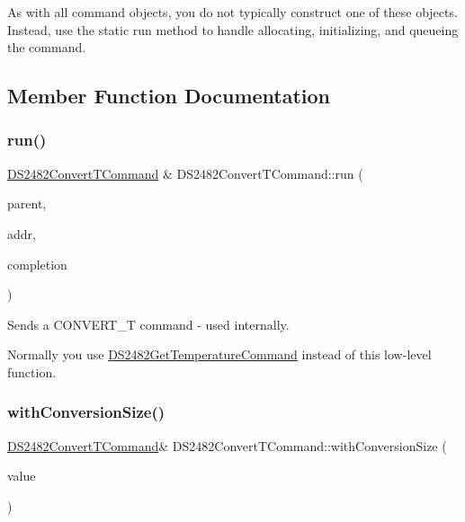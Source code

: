 As with all command objects, you do not typically construct one of these objects. Instead, use the static run method to handle allocating, initializing, and queueing the command. 

\subsection{Member Function Documentation}
\mbox{\label{class_d_s2482_convert_t_command_a81579d588ee79fadc7c41cd0bcea37f5}} 
\subsubsection{\texorpdfstring{run()}{run()}}
{\footnotesize\ttfamily \mbox{\hyperlink{class_d_s2482_convert_t_command}{D\+S2482\+Convert\+T\+Command}} \& D\+S2482\+Convert\+T\+Command\+::run (\begin{DoxyParamCaption}\item[{\mbox{\hyperlink{class_d_s2482}{D\+S2482}} \&}]{parent,  }\item[{const \mbox{\hyperlink{class_d_s24821_wire_address}{D\+S24821\+Wire\+Address}} \&}]{addr,  }\item[{std\+::function$<$ void(\mbox{\hyperlink{class_d_s2482_convert_t_command}{D\+S2482\+Convert\+T\+Command}} \&, int status)$>$}]{completion }\end{DoxyParamCaption})\hspace{0.3cm}{\ttfamily [static]}}



Sends a C\+O\+N\+V\+E\+R\+T\+\_\+T command -\/ used internally. 

Normally you use \mbox{\hyperlink{class_d_s2482_get_temperature_command}{D\+S2482\+Get\+Temperature\+Command}} instead of this low-\/level function. \mbox{\label{class_d_s2482_convert_t_command_a1813c4f607fceab23e6cd1797db8cf8f}} 
\subsubsection{\texorpdfstring{with\+Conversion\+Size()}{withConversionSize()}}
{\footnotesize\ttfamily \mbox{\hyperlink{class_d_s2482_convert_t_command}{D\+S2482\+Convert\+T\+Command}}\& D\+S2482\+Convert\+T\+Command\+::with\+Conversion\+Size (\begin{DoxyParamCaption}\item[{int}]{value }\end{DoxyParamCaption})\hspace{0.3cm}{\ttfamily [inline]}}



